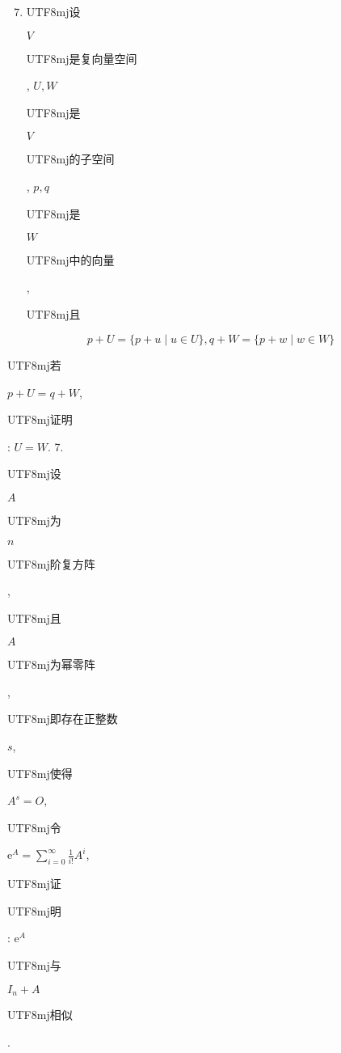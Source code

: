 \documentclass[10pt]{article}
\begin{document}
\begin{enumerate}
  \setcounter{enumi}{6}
  \item \begin{CJK}{UTF8}{mj}设\end{CJK} $V$ \begin{CJK}{UTF8}{mj}是复向量空间\end{CJK}, $U, W$ \begin{CJK}{UTF8}{mj}是\end{CJK} $V$ \begin{CJK}{UTF8}{mj}的子空间\end{CJK}, $p, q$ \begin{CJK}{UTF8}{mj}是\end{CJK} $W$ \begin{CJK}{UTF8}{mj}中的向量\end{CJK}, \begin{CJK}{UTF8}{mj}且\end{CJK}
\end{enumerate}
$$
p+U=\{p+u \mid u \in U\}, q+W=\{p+w \mid w \in W\}
$$
\begin{CJK}{UTF8}{mj}若\end{CJK} $p+U=q+W$, \begin{CJK}{UTF8}{mj}证明\end{CJK}: $U=W$. 7. \begin{CJK}{UTF8}{mj}设\end{CJK} $A$ \begin{CJK}{UTF8}{mj}为\end{CJK} $n$ \begin{CJK}{UTF8}{mj}阶复方阵\end{CJK}, \begin{CJK}{UTF8}{mj}且\end{CJK} $A$ \begin{CJK}{UTF8}{mj}为幂零阵\end{CJK}, \begin{CJK}{UTF8}{mj}即存在正整数\end{CJK} $s$, \begin{CJK}{UTF8}{mj}使得\end{CJK} $A^{s}=O$, \begin{CJK}{UTF8}{mj}令\end{CJK} $\mathrm{e}^{A}=\sum_{i=0}^{\infty} \frac{1}{i !} A^{i}$, \begin{CJK}{UTF8}{mj}证\end{CJK} \begin{CJK}{UTF8}{mj}明\end{CJK}: $\mathrm{e}^{A}$ \begin{CJK}{UTF8}{mj}与\end{CJK} $I_{n}+A$ \begin{CJK}{UTF8}{mj}相似\end{CJK}.
\end{document}
